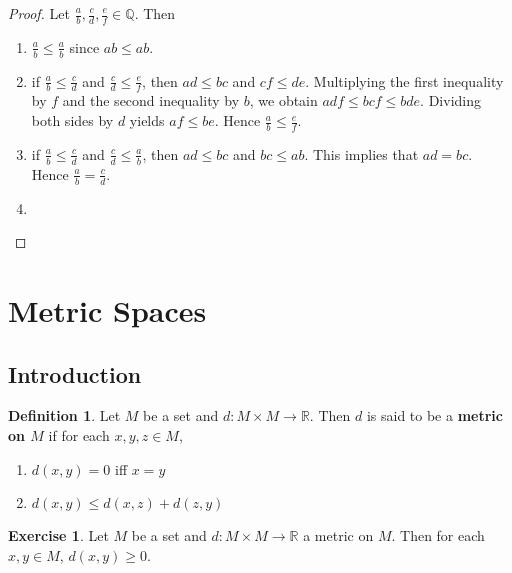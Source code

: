 \documentclass[12pt]{amsart}
\theoremstyle{definition}
\newtheorem{defn}[definition]{Definition}
\newtheorem{ex}[definition]{Exercise}
\newcommand{\R}{\mathbb{R}}
\newcommand{\Q}{\mathbb{Q}}
\newcommand{\tbf}[1]{\textbf{#1}}
\DeclareMathOperator*{\0}{\mbf{0}}
\DeclareMathOperator*{\1}{\mbf{1}}
\newcommand{\lex}[1]{\label{ex:#1}}
\newcommand{\ld}[1]{\label{defn:#1}}
\begin{document}
	\begin{proof} Let $\frac{a}{b}, \frac{c}{d}, \frac{e}{f} \in \Q$. Then
		\begin{enumerate}
			\item  $\frac{a}{b} \leq \frac{a}{b}$ since $ab \leq ab$. 
			\item if $\frac{a}{b} \leq \frac{c}{d}$ and $\frac{c}{d} \leq  \frac{e}{f}$, then $ad \leq bc$ and $ cf \leq de$. Multiplying the first inequality by $f$ and the second inequality by $b$, we obtain $adf \leq bcf \leq bde$. Dividing both sides by $d$ yields $af \leq be$. Hence $\frac{a}{b} \leq \frac{e}{f}$. 
			\item if $\frac{a}{b} \leq \frac{c}{d}$ and $\frac{c}{d} \leq \frac{a}{b}$, then $ad \leq bc$ and $bc \leq ab$. This implies that $ad = bc$. Hence $\frac{a}{b} = \frac{c}{d}$.
			\item 
		\end{enumerate}
	\end{proof}
	
	
	
	
	
	
	
	
	
	
	
	
	
	
	
	
	
	\newpage
	\section{Metric Spaces}
	\subsection{Introduction}
	\begin{defn} \ld{}
	Let $M$ be a set and $d: M \times M \rightarrow \R$. Then $d$ is said to be a \tbf{metric on $M$} if for each $x,y,z \in M$, 
	\begin{enumerate}
	\item $d(x,y) = 0$ iff $x = y$
	\item $d(x, y) \leq d(x, z) + d(z, y)$
\end{enumerate}	 
	\end{defn}	
	
	\begin{ex} \lex{}
	Let $M$ be a set and $d: M \times M \rightarrow \R$ a metric on $M$. Then for each $x,y \in M$, $d(x,y) \geq 0$. 
	\end{ex}
	
\end{document}
